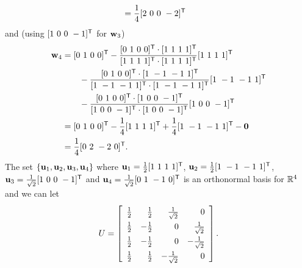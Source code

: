 \begin{example}
\begin{align*}
	&= \frac{1}{4} [2 \ 0 \ 0 \ -2]^{\mathsf{T}}
\end{align*}
and (using $[1 \ 0 \ 0 \ -1]^{\mathsf{T}}$ for $\mathbf{w}_3$)
\begin{align*}
\vw_4 &= [0 \ 1 \ 0 \ 0]^{\tr} - \frac{[0 \ 1 \ 0 \ 0]^{\tr} \cdot [1 \ 1 \ 1 \ 1]^{\tr}}{[1 \ 1 \ 1 \ 1]^{\tr} \cdot [1 \ 1 \ 1 \ 1]^{\tr}} [1 \ 1 \ 1 \ 1]^{\tr} \\
	&\qquad - \frac{[0 \ 1 \ 0 \ 0]^{\tr} \cdot [1 \ -1 \ -1 \ 1]^{\tr}}{[1 \ -1 \ -1 \ 1]^{\tr} \cdot [1 \ -1 \ -1 \ 1]^{\tr}} [1 \ -1 \ -1 \ 1]^{\tr} \\
	&\qquad - \frac{[0 \ 1 \ 0 \ 0]^{\tr} \cdot [1 \ 0 \ 0 \ -1]^{\tr}}{[1 \ 0 \ 0 \ -1]^{\tr} \cdot [1 \ 0 \ 0 \ -1]^{\tr}} [1 \ 0 \ 0 \ -1]^{\tr} \\
	&= [0 \ 1 \ 0 \ 0]^{\tr} - \frac{1}{4}[1 \ 1 \ 1 \ 1]^{\tr} + \frac{1}{4} [1 \ -1 \ -1 \ 1]^{\tr} - \vzero \\
	&= \frac{1}{4} [0 \ 2 \ -2 \ 0]^{\tr}.
\end{align*}
The set $\{\mathbf{u}_1, \mathbf{u}_2, \mathbf{u}_3, \mathbf{u}_4\}$ where $\mathbf{u}_1 = \frac{1}{2}[1 \ 1 \ 1 \ 1]^{\mathsf{T}}$, $\mathbf{u}_2 = \frac{1}{2}[1 \ -1 \ -1 \ 1]^{\mathsf{T}}$, $\vu_3 = \frac{1}{\sqrt{2}}[1 \ 0 \ 0 \ -1]^{\tr}$ and $\mathbf{u}_4 = \frac{1}{\sqrt{2}}[0 \ 1 \ -1 \ 0]^{\mathsf{T}}$ is an orthonormal basis for $\mathbb{R}^4$ and we can let 
\[U = \left[ \renewcommand{\arraystretch}{1.4} \begin{array}{crrr} \frac{1}{2} & \frac{1}{2} & \frac{1}{\sqrt{2}} & 0 \\ \frac{1}{2} & -\frac{1}{2} & 0 & \frac{1}{\sqrt{2}} \\  \frac{1}{2} & -\frac{1}{2} & 0 & -\frac{1}{\sqrt{2}} \\ \frac{1}{2} & \frac{1}{2} & -\frac{1}{\sqrt{2}} & 0 \\\end{array} \right].\]


\end{example}
